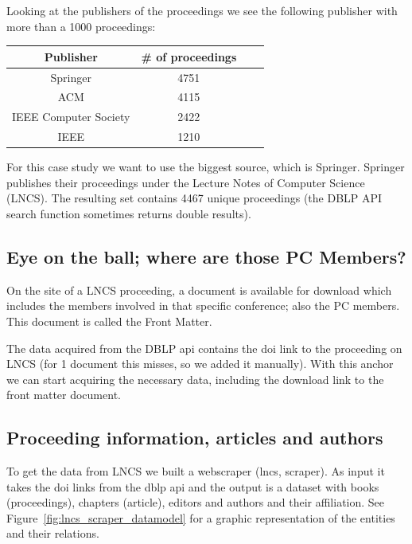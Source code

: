 \documentclass{ou-report}
\begin{document}
Looking at the publishers of the proceedings we see the following publisher with 
more than a 1000 proceedings:
\begin{center}
    \begin{tabular}{ |c|c|c|c| }
        \hline
        Publisher & \# of proceedings \\
        \hline
        Springer & 4751 \\
        ACM & 4115 \\
        IEEE Computer Society & 2422 \\
        IEEE & 1210 \\
        \hline
    \end{tabular}
\end{center}
For this case study we want to use the biggest source, which is Springer. 
Springer publishes their proceedings under the Lecture 
Notes of Computer Science (LNCS). The resulting set contains 4467 unique 
proceedings (the DBLP API search function sometimes returns double results).

\subsection{Eye on the ball; where are those PC Members?}
On the site of a LNCS proceeding, a document is available for download which 
includes the members involved in that specific conference; also the PC members. This 
document is called the Front Matter.

The data acquired from the DBLP api contains the doi link to 
the proceeding on LNCS (for 1 document this misses, so we added it manually). 
With this anchor we can start acquiring the necessary data, including the 
download link to the front matter document.

\subsection{Proceeding information, articles and authors}
\label{subsec:springer_website}
To get the data from LNCS we built a webscraper (lncs, scraper). As input it 
takes the doi links from the dblp api and the output is a dataset with books 
(proceedings), chapters (article), editors and authors and their affiliation. 
See Figure~\ref{fig:lncs_scraper_datamodel} for a graphic representation of the 
entities and their relations.
\end{document}
